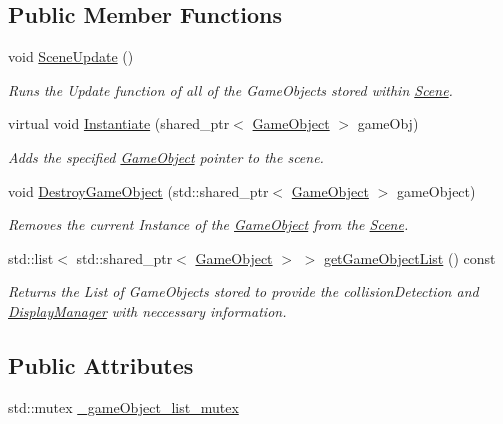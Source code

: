 \subsection*{Public Member Functions}
\begin{DoxyCompactItemize}
\item 
\mbox{\label{class_scene_a1d902efeacc113ceb2dd79a976b04a77}} 
void \hyperlink{class_scene_a1d902efeacc113ceb2dd79a976b04a77}{Scene\+Update} ()
\begin{DoxyCompactList}\small\item\em Runs the Update function of all of the Game\+Objects stored within \hyperlink{class_scene}{Scene}. \end{DoxyCompactList}\item 
virtual void \hyperlink{class_scene_a3dd730cba4a22bf75e54c4b644c26976}{Instantiate} (shared\+\_\+ptr$<$ \hyperlink{class_game_object}{Game\+Object} $>$ game\+Obj)
\begin{DoxyCompactList}\small\item\em Adds the specified \hyperlink{class_game_object}{Game\+Object} pointer to the scene. \end{DoxyCompactList}\item 
void \hyperlink{class_scene_a2e47a6610a3bb6e85373f5b297645754}{Destroy\+Game\+Object} (std\+::shared\+\_\+ptr$<$ \hyperlink{class_game_object}{Game\+Object} $>$ game\+Object)
\begin{DoxyCompactList}\small\item\em Removes the current Instance of the \hyperlink{class_game_object}{Game\+Object} from the \hyperlink{class_scene}{Scene}. \end{DoxyCompactList}\item 
std\+::list$<$ std\+::shared\+\_\+ptr$<$ \hyperlink{class_game_object}{Game\+Object} $>$ $>$ \hyperlink{class_scene_a717b5fcf248038c51b205b022301318f}{get\+Game\+Object\+List} () const
\begin{DoxyCompactList}\small\item\em Returns the List of Game\+Objects stored to provide the collision\+Detection and \hyperlink{class_display_manager}{Display\+Manager} with neccessary information. \end{DoxyCompactList}\end{DoxyCompactItemize}
\subsection*{Public Attributes}
\begin{DoxyCompactItemize}
\item 
std\+::mutex \hyperlink{class_scene_a29183cf37f5227ea9a82d2a15c42336c}{\+\_\+game\+Object\+\_\+list\+\_\+mutex}
\end{DoxyCompactItemize}
